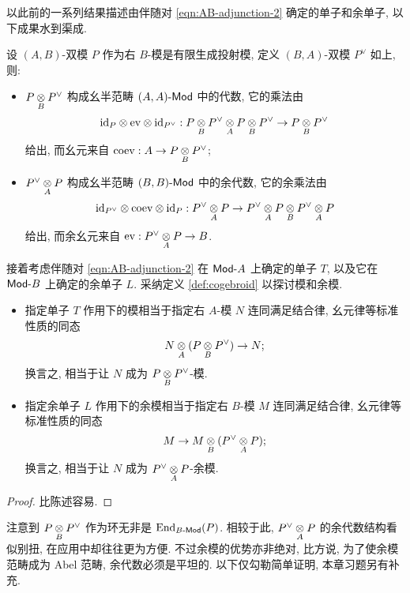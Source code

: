 以此前的一系列结果描述由伴随对 \eqref{eqn:AB-adjunction-2} 确定的单子和余单子, 以下成果水到渠成.

\begin{proposition}\label{prop:Morita-comonad}
	设 $(A, B)$-双模 $P$ 作为右 $B$-模是有限生成投射模, 定义 $(B, A)$-双模 $P^\vee$ 如上, 则:
	\begin{itemize}
		\item $P \underset{B}{\otimes} P^\vee$ 构成幺半范畴 $(A, A)\text{-}\mathsf{Mod}$ 中的代数, 它的乘法由
		\[ \mathrm{id}_P \otimes \mathrm{ev} \otimes \mathrm{id}_{P^\vee}: P \underset{B}{\otimes} P^\vee \underset{A}{\otimes} P \underset{B}{\otimes} P^\vee \to P \underset{B}{\otimes} P^\vee \]
		给出, 而幺元来自 $\mathrm{coev}: A \to P \underset{B}{\otimes} P^\vee$;
		\item $P^\vee \underset{A}{\otimes} P$ 构成幺半范畴 $(B, B)\text{-}\mathsf{Mod}$ 中的余代数, 它的余乘法由
		\[ \mathrm{id}_{P^\vee} \otimes \mathrm{coev} \otimes \mathrm{id}_P: P^\vee \underset{A}{\otimes} P \to P^\vee \underset{A}{\otimes} P \underset{B}{\otimes} P^\vee \underset{A}{\otimes} P \]
		给出, 而余幺元来自 $\mathrm{ev}: P^\vee \underset{A}{\otimes} P \to B$.
	\end{itemize}

	接着考虑伴随对 \eqref{eqn:AB-adjunction-2} 在 $\mathsf{Mod}\text{-}A$ 上确定的单子 $T$, 以及它在 $\mathsf{Mod}\text{-}B$ 上确定的余单子 $L$. 采纳定义 \ref{def:cogebroid} 以探讨模和余模.
	\begin{itemize}
		\item 指定单子 $T$ 作用下的模相当于指定右 $A$-模 $N$ 连同满足结合律, 幺元律等标准性质的同态
		\[ N \underset{A}{\otimes} (P \underset{B}{\otimes} P^\vee) \to N; \]
		换言之, 相当于让 $N$ 成为 $P \underset{B}{\otimes} P^\vee$-模.
		\item 指定余单子 $L$ 作用下的余模相当于指定右 $B$-模 $M$ 连同满足结合律, 幺元律等标准性质的同态
		\[ M \to M \underset{B}{\otimes} (P^\vee \underset{A}{\otimes} P); \]
		换言之, 相当于让 $N$ 成为 $P^\vee \underset{A}{\otimes} P$-余模.
	\end{itemize}
\end{proposition}
\begin{proof}
	比陈述容易.
\end{proof}

注意到 $P \underset{B}{\otimes} P^\vee$ 作为环无非是 $\operatorname{End}_{B\text{-}\mathsf{Mod}}(P)$. 相较于此, $P^\vee \underset{A}{\otimes} P$ 的余代数结构看似别扭, 在应用中却往往更为方便. 不过余模的优势亦非绝对, 比方说, 为了使余模范畴成为 Abel 范畴, 余代数必须是平坦的. 以下仅勾勒简单证明, 本章习题另有补充.

